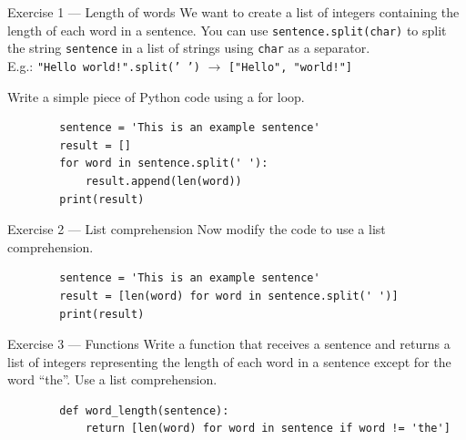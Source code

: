 \documentclass[aspectratio=169,handout]{beamer}
\begin{document}
\begin{frame}[fragile]{Exercise 1 --- Length of words }
    We want to create a list of integers containing the length of each word in a sentence. You can use
    \texttt{sentence.split(char)} to split the string \texttt{sentence} in a list of strings using \texttt{char} as a
    separator.\\
    E.g.: \texttt{"Hello world!".split(' ')} $\rightarrow$ \texttt{["Hello", "world!"]}

    Write a simple piece of Python code using a for loop.

    \pause
    \begin{verbatim}
        sentence = 'This is an example sentence'
        result = []
        for word in sentence.split(' '):
            result.append(len(word))
        print(result)
    \end{verbatim}
\end{frame}

\begin{frame}[fragile]{Exercise 2 --- List comprehension}
    Now modify the code to use a list comprehension.

    \pause
    \begin{verbatim}
        sentence = 'This is an example sentence'
        result = [len(word) for word in sentence.split(' ')]
        print(result)
    \end{verbatim}
\end{frame}

\begin{frame}[fragile]{Exercise 3 --- Functions}
    Write a function that receives a sentence and returns a list of integers representing the length of each word in a
    sentence except for the word ``the''. Use a list comprehension.

    \pause
    \begin{verbatim}
        def word_length(sentence):
            return [len(word) for word in sentence if word != 'the']
    \end{verbatim}
\end{frame}
\end{document}
